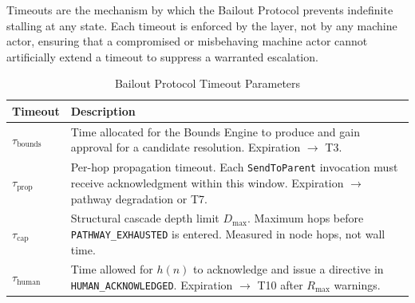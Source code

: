Timeouts are the mechanism by which the Bailout Protocol prevents indefinite stalling at any state. Each timeout is enforced by the \fact{} layer, not by any machine actor, ensuring that a compromised or misbehaving machine actor cannot artificially extend a timeout to suppress a warranted escalation.

\begin{table}[h]
\caption{Bailout Protocol Timeout Parameters}
\label{tab:bp-timeouts}
\small
\begin{tabular}{lp{5.5cm}}
\toprule
\textbf{Timeout} & \textbf{Description} \\
\midrule
$\tau_{\text{bounds}}$ & Time allocated for the Bounds Engine to produce and gain approval for a candidate resolution. Expiration $\rightarrow$ T3. \\
$\tau_{\text{prop}}$  & Per-hop propagation timeout. Each \texttt{SendToParent} invocation must receive acknowledgment within this window. Expiration $\rightarrow$ pathway degradation or T7. \\
$\tau_{\text{cap}}$   & Structural cascade depth limit $D_{\max}$. Maximum hops before \texttt{PATHWAY\_EXHAUSTED} is entered. Measured in node hops, not wall time. \\
$\tau_{\text{human}}$ & Time allowed for $h(n)$ to acknowledge and issue a directive in \texttt{HUMAN\_ACKNOWLEDGED}. Expiration $\rightarrow$ T10 after $R_{\max}$ warnings. \\
\bottomrule
\end{tabular}
\end{table}

